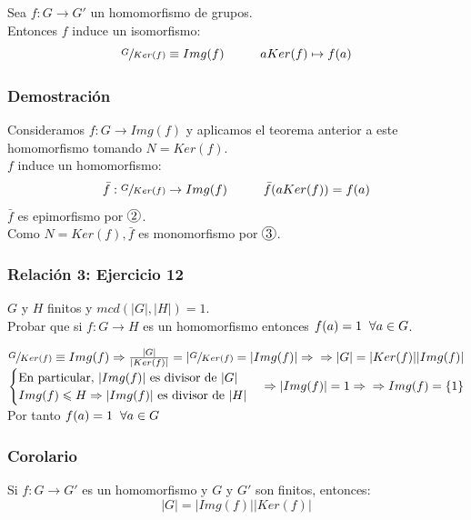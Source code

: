 \documentclass[11pt,a4paper]{article}
\newcommand*{\circled}[2][]{\tikz[baseline=(C.base)]{
	\node[inner sep=0pt] (C) {\vphantom{1g}#2};
	\node[draw, circle, inner sep=1pt, yshift=1pt]
		at (C.center) {\vphantom{1g}};}}
\begin{document}
Sea $f: G \to G'$ un homomorfismo de grupos. \\
Entonces $f$ induce un isomorfismo:
$$\sfrac{G}{Ker(f)} \equiv Img(f) \hspace{1cm} aKer(f) \mapsto f(a)$$

\subsubsection*{Demostración}

Consideramos $f: G \to Img(f)$ y aplicamos el teorema anterior a este homomorfismo tomando $N = Ker(f)$. \\
$f$ induce un homomorfismo:
$$\bar{f}: \sfrac{G}{Ker(f)} \to Img(f) \hspace{1cm} \bar{f}(aKer(f)) = f(a)$$
$\bar{f}$ es epimorfismo por $\circled{2}$. \\
Como $N = Ker(f), \bar{f}$ es monomorfismo por $\circled{3}$.

\subsubsection*{Relación 3: Ejercicio 12}

$G$ y $H$ finitos y $mcd(|G|, |H|) = 1$. \\
Probar que si $f: G \to H$ es un homomorfismo entonces $f(a) = 1 \hspace{0.2cm} \forall a \in G$.

$\sfrac{G}{Ker(f)} \equiv Img(f) \Rightarrow \frac{|G|}{|Ker(f)|} = |\sfrac{G}{Ker(f)} = |Img(f)| \Rightarrow \\ \Rightarrow |G| = |Ker(f)||Img(f)|$ \\
$\begin{cases}
\text{En particular, } |Img(f)| \text{ es divisor de } |G| \\
Img(f) \leqslant H \Rightarrow |Img(f)| \text{ es divisor de } |H|
\end{cases}
\Rightarrow |Img(f)| = 1 \Rightarrow \\ \Rightarrow Img(f) = \{1\}$ \\
Por tanto $f(a) = 1 \hspace{0.2cm} \forall a \in G$

\subsubsection*{Corolario}

Si $f: G \to G'$ es un homomorfismo y $G$ y $G'$ son finitos, entonces:
$$|G| = |Img(f)||Ker(f)|$$
\end{document}
